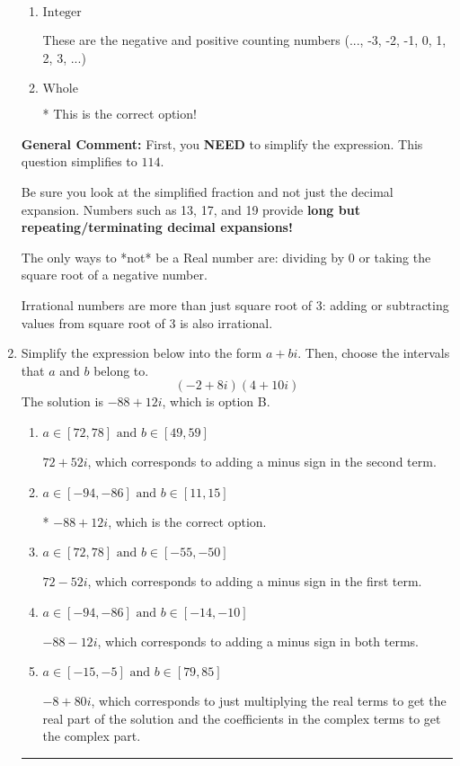 \documentclass{extbook}[14pt]
\newcommand{\litem}[1]{\item #1

\rule{\textwidth}{0.4pt}}
\begin{document}
\begin{enumerate}
{\begin{enumerate}[label=\Alph*.]
These cannot be written as a fraction of Integers.
\item \( \text{Integer} \)

These are the negative and positive counting numbers (..., -3, -2, -1, 0, 1, 2, 3, ...)
\item \( \text{Whole} \)

* This is the correct option!
\end{enumerate}

\textbf{General Comment:} First, you \textbf{NEED} to simplify the expression. This question simplifies to $114$. 
 
 Be sure you look at the simplified fraction and not just the decimal expansion. Numbers such as 13, 17, and 19 provide \textbf{long but repeating/terminating decimal expansions!} 
 
 The only ways to *not* be a Real number are: dividing by 0 or taking the square root of a negative number. 
 
 Irrational numbers are more than just square root of 3: adding or subtracting values from square root of 3 is also irrational.
}
\litem{
Simplify the expression below into the form $a+bi$. Then, choose the intervals that $a$ and $b$ belong to.
\[ (-2 + 8 i)(4 + 10 i) \]The solution is \( -88 + 12 i \), which is option B.\begin{enumerate}[label=\Alph*.]
\item \( a \in [72, 78] \text{ and } b \in [49, 59] \)

 $72 + 52 i$, which corresponds to adding a minus sign in the second term.
\item \( a \in [-94, -86] \text{ and } b \in [11, 15] \)

* $-88 + 12 i$, which is the correct option.
\item \( a \in [72, 78] \text{ and } b \in [-55, -50] \)

 $72 - 52 i$, which corresponds to adding a minus sign in the first term.
\item \( a \in [-94, -86] \text{ and } b \in [-14, -10] \)

 $-88 - 12 i$, which corresponds to adding a minus sign in both terms.
\item \( a \in [-15, -5] \text{ and } b \in [79, 85] \)

 $-8 + 80 i$, which corresponds to just multiplying the real terms to get the real part of the solution and the coefficients in the complex terms to get the complex part.
\end{enumerate}

}
\end{enumerate}
\end{document}
